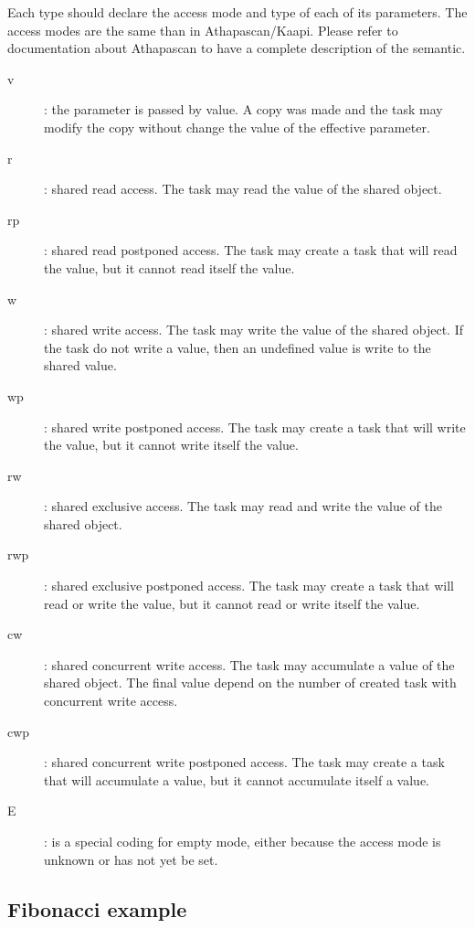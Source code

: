 \documentclass[12pt]{report}
\begin{document}
Each type should declare the access mode and type of each of its parameters. The access modes are the same than in Athapascan/Kaapi. Please refer to documentation about Athapascan to have a complete description of the semantic.
\begin{description}
\item [v]: the parameter is passed by value. A copy was made and the task may modify the copy without change the value of the effective parameter.
\item [r]: shared read access. The task may read the value of the shared object.
\item [rp]: shared read postponed access. The task may create a task that will read the value, but it cannot read itself the value.
\item [w]: shared write access. The task may write the value of the shared object. If the task do not write a value, then an undefined value is write to the shared value.
\item [wp]: shared write postponed access. The task may create a task that will write the value, but it cannot write itself the value.
\item [rw]: shared exclusive access. The task may read and write the value of the shared object.
\item [rwp]: shared exclusive postponed access. The task may create a task that will read or write the value, but it cannot read or write itself the value.
\item [cw]: shared concurrent write access. The task may accumulate a value of the shared object. The final value depend on the number of created task with concurrent write access.
\item [cwp]: shared concurrent write postponed access. The task may create a task that will accumulate a value, but it cannot accumulate itself a value.
\item [E]: is a special coding for empty mode, either because the access mode is unknown or has not yet be set.
\end{description}


\subsection{Fibonacci example}
\end{document}
